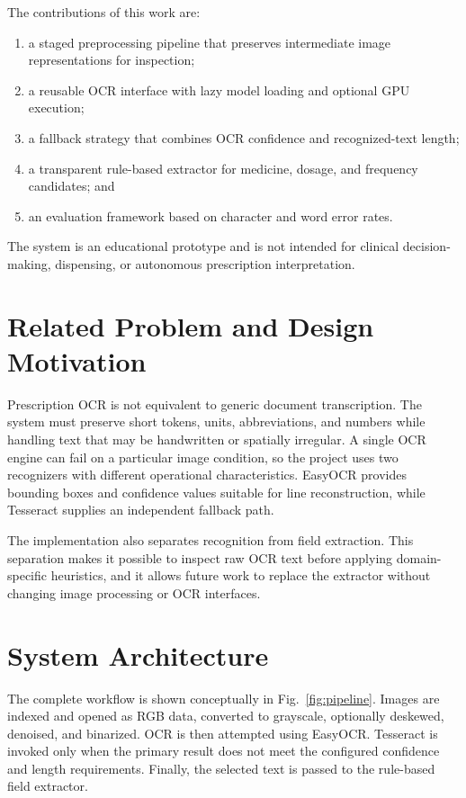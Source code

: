 \documentclass[conference]{IEEEtran}
\begin{document}
The contributions of this work are:
\begin{enumerate}
    \item a staged preprocessing pipeline that preserves intermediate image
    representations for inspection;
    \item a reusable OCR interface with lazy model loading and optional GPU
    execution;
    \item a fallback strategy that combines OCR confidence and recognized-text
    length;
    \item a transparent rule-based extractor for medicine, dosage, and
    frequency candidates; and
    \item an evaluation framework based on character and word error rates.
\end{enumerate}

The system is an educational prototype and is not intended for clinical
decision-making, dispensing, or autonomous prescription interpretation.

\section{Related Problem and Design Motivation}
\label{sec:motivation}

Prescription OCR is not equivalent to generic document transcription. The
system must preserve short tokens, units, abbreviations, and numbers while
handling text that may be handwritten or spatially irregular. A single OCR
engine can fail on a particular image condition, so the project uses two
recognizers with different operational characteristics. EasyOCR provides
bounding boxes and confidence values suitable for line reconstruction, while
Tesseract supplies an independent fallback path.

The implementation also separates recognition from field extraction. This
separation makes it possible to inspect raw OCR text before applying
domain-specific heuristics, and it allows future work to replace the extractor
without changing image processing or OCR interfaces.

\section{System Architecture}
\label{sec:architecture}

The complete workflow is shown conceptually in Fig.~\ref{fig:pipeline}.
Images are indexed and opened as RGB data, converted to grayscale, optionally
deskewed, denoised, and binarized. OCR is then attempted using EasyOCR.
Tesseract is invoked only when the primary result does not meet the configured
confidence and length requirements. Finally, the selected text is passed to the
rule-based field extractor.
\end{document}
